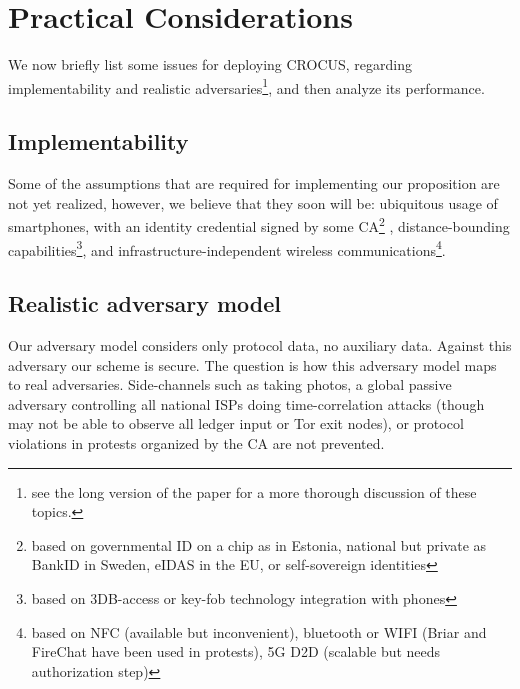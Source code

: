 \section{Practical Considerations}%
\label{Practical}

We now briefly list some issues for deploying
CROCUS, regarding implementability and realistic adversaries\footnote{see the long version of the paper for a more thorough
discussion of these topics. }, and then analyze its performance. 

\subsection{Implementability}

Some of the assumptions that are required for implementing our proposition are 
not yet realized, however, we believe that they soon will be:
ubiquitous usage of smartphones, with an identity credential
signed by some \ac{CA}\footnote{based on \eg governmental ID on a chip as in Estonia, national
  but private as BankID in Sweden, eIDAS in the EU, or self-sovereign
  identities} ,  distance-bounding capabilities\footnote{based on \eg
  3DB-access or key-fob technology integration with phones}, and
infrastructure-independent wireless communications\footnote{based on
  \eg NFC (available but inconvenient), bluetooth or WIFI (Briar and
  FireChat have been used in protests), 5G D2D (scalable but needs
  authorization step)}.

\subsection{Realistic adversary model}
Our adversary model considers only protocol data, no auxiliary data.
Against this adversary our scheme is secure.
The question is how this adversary model maps to real
adversaries. Side-channels such as taking photos, a global passive adversary
controlling all national ISPs doing time-correlation attacks (though
may not be able to observe all ledger input or \eg Tor exit nodes), or
protocol violations in protests organized by the \ac{CA} are
not prevented.

%